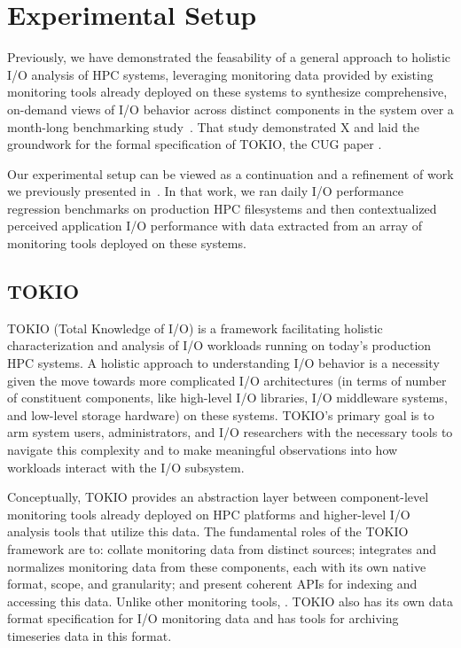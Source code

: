 \section{Experimental Setup}


Previously, we have demonstrated the feasability of a general approach to holistic I/O analysis of HPC systems, leveraging monitoring data provided by existing monitoring tools already deployed on these systems to synthesize comprehensive, on-demand views of I/O behavior across distinct components in the system over a month-long benchmarking study~\cite{Lockwood2017}. That study demonstrated X and laid the groundwork for the formal specification of TOKIO, the CUG paper \cite{LockwoodCUG2018}.

Our experimental setup can be viewed as a continuation and a refinement of work we previously presented in~\cite{Lockwood2017}. In that work, we ran daily I/O performance regression benchmarks on production HPC filesystems and then contextualized perceived application I/O performance with data extracted from an array of monitoring tools deployed on these systems. 

\subsection{TOKIO}

TOKIO (Total Knowledge of I/O) is a framework facilitating holistic characterization and analysis of I/O workloads running on today's production HPC systems. A holistic approach to understanding I/O behavior is a necessity given the move towards more complicated I/O architectures (in terms of number of constituent components, like high-level I/O libraries, I/O middleware systems, and low-level storage hardware) on these systems. TOKIO's primary goal is to arm system users, administrators, and I/O researchers with the necessary tools to navigate this complexity and to make meaningful observations into how workloads interact with the I/O subsystem.

Conceptually, TOKIO provides an abstraction layer between component-level monitoring tools already deployed on HPC platforms and higher-level I/O analysis tools that utilize this data. The fundamental roles of the TOKIO framework are to: collate monitoring data from distinct sources; integrates and normalizes monitoring data from these components, each with its own native format, scope, and granularity; and present coherent APIs for indexing and accessing this data. Unlike other monitoring tools, .
TOKIO also has its own data format specification for I/O monitoring data and has tools for archiving timeseries data in this format.

